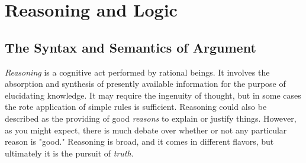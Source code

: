 


\toclineskip
\section{Reasoning and Logic}




\subsection{The Syntax and Semantics of Argument}

\textit{Reasoning} is a cognitive act performed by rational beings. It involves the absorption and synthesis of presently available information for the purpose of elucidating knowledge. It may require the ingenuity of thought, but in some cases the rote application of simple rules is sufficient. Reasoning could also be described as the providing of good \textit{reasons} to explain or justify things. However, as you might expect, there is much debate over whether or not any particular reason is "good." Reasoning is broad, and it comes in different flavors, but ultimately it is the pursuit of \textit{truth}. \\

